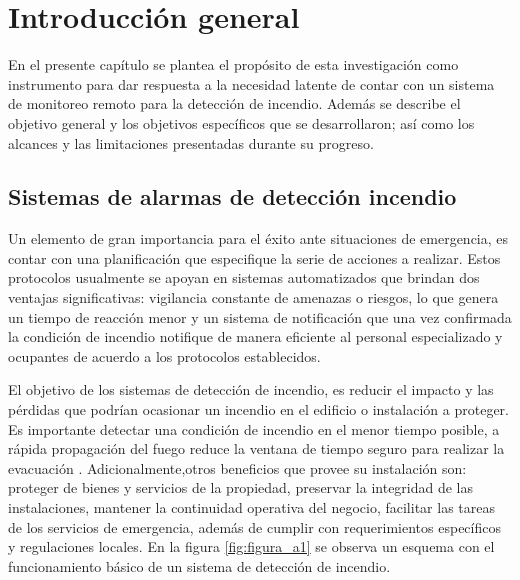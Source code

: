 
\chapter{Introducción general} %

\label{Chapter1} %
\label{IntroGeneral}


\newcommand{\keyword}[1]{\textbf{#1}}
\newcommand{\tabhead}[1]{\textbf{#1}}
\newcommand{\code}[1]{\texttt{#1}}
\newcommand{\file}[1]{\texttt{\bfseries#1}}
\newcommand{\option}[1]{\texttt{\itshape#1}}
\newcommand{\grados}{$^{\circ}$}


En el presente capítulo se plantea el propósito de esta investigación como instrumento para dar respuesta a la necesidad latente de contar con un sistema de monitoreo remoto para la detección de incendio. Además se describe el objetivo general y los objetivos específicos que se desarrollaron; así como los alcances y las limitaciones presentadas durante su progreso.

\section{Sistemas de alarmas de detección incendio}

Un elemento de gran importancia para el éxito ante situaciones de emergencia, es contar con una planificación que especifique la serie de acciones a realizar. Estos protocolos usualmente se apoyan en sistemas automatizados que brindan dos ventajas significativas: vigilancia constante de amenazas o riesgos, lo que genera un tiempo de reacción menor  y un sistema de notificación que una vez confirmada la condición de incendio notifique de manera eficiente al personal especializado y ocupantes de acuerdo a los protocolos establecidos.

El objetivo de los sistemas de detección de incendio, es reducir el impacto y las pérdidas que podrían ocasionar un incendio en el edificio o instalación a proteger. Es importante detectar una condición de incendio en el menor tiempo posible, a rápida propagación del fuego reduce la ventana de tiempo seguro para realizar la evacuación \cite{deteccion}. Adicionalmente,otros beneficios que provee su instalación son: proteger de bienes y servicios de la propiedad, preservar la integridad de las instalaciones, mantener la continuidad operativa del negocio, facilitar las tareas de los servicios de emergencia, además de cumplir con requerimientos específicos y regulaciones locales. En la figura \ref{fig:figura_a1} se observa un esquema con el funcionamiento básico de un sistema de detección de incendio.  

